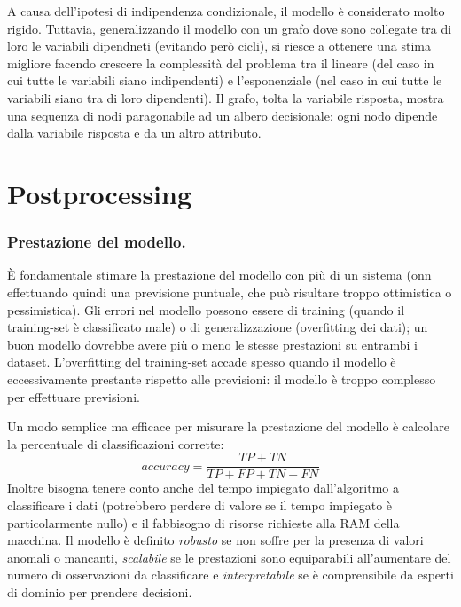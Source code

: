 \documentclass[11pt, a4page, twocolumn]{article}
\begin{document}
A causa dell'ipotesi di indipendenza condizionale, il modello è considerato molto rigido.
Tuttavia, generalizzando il modello con un grafo dove sono collegate tra di loro le variabili dipendneti (evitando però cicli), si riesce a ottenere una stima migliore facendo crescere la complessità del problema tra il lineare (del caso in cui tutte le variabili siano indipendenti) e l'esponenziale (nel caso in cui tutte le variabili siano tra di loro dipendenti).
Il grafo, tolta la variabile risposta, mostra una sequenza di nodi paragonabile ad un albero decisionale: ogni nodo dipende dalla variabile risposta e da un altro attributo.



\newpage
\part{Postprocessing}

\section{Prestazione del modello.}
È fondamentale stimare la prestazione del modello con più di un sistema (onn effettuando quindi una previsione puntuale, che può risultare troppo ottimistica o pessimistica).
Gli errori nel modello possono essere di training (quando il training-set è classificato male) o di generalizzazione (overfitting dei dati); un buon modello dovrebbe avere più o meno le stesse prestazioni su entrambi i dataset.
L'overfitting del training-set accade spesso quando il modello è eccessivamente prestante rispetto alle previsioni: il modello è troppo complesso per effettuare previsioni.

Un modo semplice ma efficace per misurare la prestazione del modello è calcolare la percentuale di classificazioni corrette:
\begin{equation*}
  accuracy = \frac{TP + TN}{TP + FP + TN + FN}
\end{equation*}
Inoltre bisogna tenere conto anche del tempo impiegato dall'algoritmo a classificare i dati (potrebbero perdere di valore se il tempo impiegato è particolarmente nullo) e il fabbisogno di risorse richieste alla RAM della macchina.
Il modello è definito \textit{robusto} se non soffre per la presenza di valori anomali o mancanti, \textit{scalabile} se le prestazioni sono equiparabili all'aumentare del numero di osservazioni da classificare e \textit{interpretabile} se è comprensibile da esperti di dominio per prendere decisioni. \newline
\end{document}
